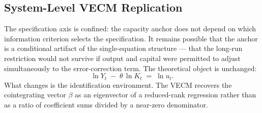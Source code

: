\documentclass[11pt,a4paper]{article}
\begin{document}
\subsection{System-Level VECM Replication}
\label{sec:S2}


The specification axis is confined: the capacity anchor does not depend on
which information criterion selects the specification. It remains possible
that the anchor is a conditional artifact of the single-equation structure
--- that the long-run restriction would not survive if output and capital
were permitted to adjust simultaneously to the error-correction term. The
theoretical object is unchanged:
%
\begin{equation}
	\label{eq:S2_capacity}
	\ln Y_t \;-\; \theta \,\ln K_t \;=\; \ln u_t.
\end{equation}
%
What changes is the identification environment. The VECM recovers the
cointegrating vector $\beta$ as an eigenvector of a reduced-rank regression
rather than as a ratio of coefficient sums divided by a near-zero
denominator.
\end{document}
